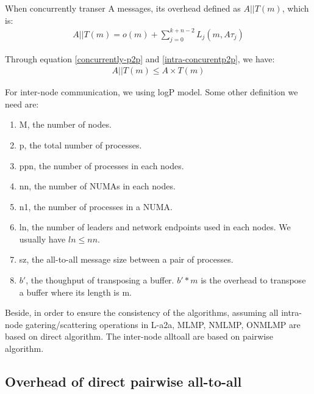 When concurrently transer A messages, its overhead defined as $A||T(m)$, which is: 
\begin{equation}
\label{intra-concurentp2p}
\begin{split}
A||T(m)  = o(m) + \sum_{j=0}^{k+n-2}L_{j}(m,A\tau_j)
\end{split}
\end{equation}

Through equation \ref{concurrently-p2p} and \ref{intra-concurentp2p}, we have:
\begin{equation}
\label{concurent-unequation}
\begin{split}
A||T(m)  \le A \times T(m) 
\end{split}
\end{equation}


For inter-node communication, we using logP model.
Some other definition we need are:
\begin{enumerate}[(1)]
\item M, the number of nodes.
\item p, the total number of processes.
\item ppn, the number of processes in each nodes.
\item nn, the number of NUMAs in each nodes. 
\item n1, the number of processes in a NUMA.
\item ln, the number of leaders and network endpoints used in each nodes. We usually have $ln \le nn$.
\item sz, the all-to-all message size between a pair of processes.
\item $b'$, the thoughput of transposing a buffer. $b' * m$ is the overhead to transpose a buffer where its length is m.
\end{enumerate}

Beside, in order to ensure the consistency of the algorithms, assuming all intra-node gatering/scattering operations in L-a2a, MLMP, NMLMP, ONMLMP are based on direct algorithm.
The inter-node alltoall are based on pairwise algorithm.
\subsection {Overhead of direct pairwise all-to-all}

